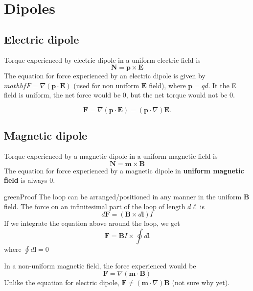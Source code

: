\documentclass[12pt,a4paper]{extreport}
\numberwithin{equation}{chapter}
\begin{document}
    \section{Dipoles}
    \subsection{Electric dipole}
    Torque experienced by electric dipole in a uniform electric field is
    \begin{equation}
        \mathbf{N}=\mathbf{p} \times \mathbf{E}
    \end{equation}
    The equation for force experienced by an electric dipole is given by $mathbf{F}=\nabla(\mathbf{p} \cdot \mathbf{E})$ (used for non uniform $\mathbf{E}$ field), where $\mathbf{p}=qd$. It the E field is uniform, the net force would be 0, but the net torque would not be 0.

    \begin{equation}
        \mathbf{F}=\nabla(\mathbf{p} \cdot \mathbf{E})=(\mathbf{p} \cdot \nabla)\mathbf{E}.
    \end{equation}

    \subsection{Magnetic dipole}
    Torque experienced by a magnetic dipole in a uniform magnetic field is 
    \begin{equation}
        \mathbf{N}=\mathbf{m}\times \mathbf{B}
    \end{equation}
    The equation for force experienced by a magnetic dipole in \textbf{uniform magnetic field} is always 0. 
    \begin{mybox}{green}{Proof}
        The loop can be arranged/positioned in any manner in the uniform $\mathbf{B}$ field.
        The force on an infinitesimal part of the loop of length $d\ell$ is 
        \begin{equation}
            d\mathbf{F}=(\mathbf{B} \times d\mathbf{l})I
        \end{equation}
        If we integrate the equation above around the loop, we get 
        \begin{equation}
            \mathbf{F}=\mathbf{B}I\times\oint d\mathbf{l}
        \end{equation}  
        where $\oint d\mathbf{l}=0$
    \end{mybox}
    In a non-uniform magnetic field, the force experienced would be
    \begin{equation}
        \mathbf{F}=\nabla(\mathbf{m}\cdot \mathbf{B})
    \end{equation}
    Unlike the equation for electric dipole, $\mathbf{F} \neq (\mathbf{m}\cdot \nabla)\mathbf{B}$ (not sure why yet).  
\end{document}
